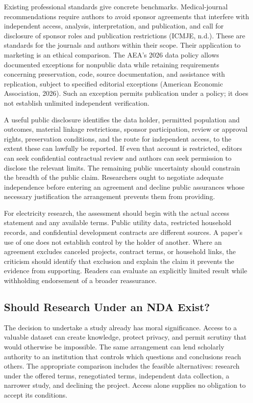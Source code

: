 Existing professional standards give concrete benchmarks.
Medical-journal recommendations require authors to avoid sponsor
agreements that interfere with independent access, analysis,
interpretation, and publication, and call for disclosure of sponsor
roles and publication restrictions (ICMJE, n.d.). These are standards
for the journals and authors within their scope. Their application to
marketing is an ethical comparison. The AEA's 2026 data policy allows
documented exceptions for nonpublic data while retaining requirements
concerning preservation, code, source documentation, and assistance with
replication, subject to specified editorial exceptions (American
Economic Association, 2026). Such an exception permits publication under
a policy; it does not establish unlimited independent verification.

A useful public disclosure identifies the data holder, permitted
population and outcomes, material linkage restrictions, sponsor
participation, review or approval rights, preservation conditions, and
the route for independent access, to the extent these can lawfully be
reported. If even that account is restricted, editors can seek
confidential contractual review and authors can seek permission to
disclose the relevant limits. The remaining public uncertainty should
constrain the breadth of the public claim. Researchers ought to
negotiate adequate independence before entering an agreement and decline
public assurances whose necessary justification the arrangement prevents
them from providing.

For electricity research, the assessment should begin with the actual
access statement and any available terms. Public utility data,
restricted household records, and confidential development contracts are
different sources. A paper's use of one does not establish control by
the holder of another. Where an agreement excludes canceled projects,
contract terms, or household links, the criticism should identify that
exclusion and explain the claim it prevents the evidence from
supporting. Readers can evaluate an explicitly limited result while
withholding endorsement of a broader reassurance.

\hypertarget{M09-should-research-under-an-nda-exist}{%
\subsection{Should Research Under an NDA
Exist?}\label{M09-should-research-under-an-nda-exist}}

\noindent The decision to undertake a study already has moral significance. Access
to a valuable dataset can create knowledge, protect privacy, and permit
scrutiny that would otherwise be impossible. The same arrangement can
lend scholarly authority to an institution that controls which questions
and conclusions reach others. The appropriate comparison includes the
feasible alternatives: research under the offered terms, renegotiated
terms, independent data collection, a narrower study, and declining the
project. Access alone supplies no obligation to accept its conditions.

